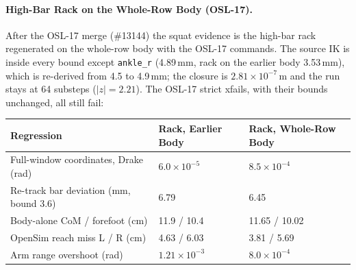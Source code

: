 \documentclass[11pt,a4paper]{article}
\begin{document}
\paragraph{High-Bar Rack on the Whole-Row Body (OSL-17).} After the OSL-17
merge (\#13144) the squat evidence is the high-bar rack regenerated on the
whole-row body with the OSL-17 commands. The source IK is inside every bound
except \texttt{ankle\_r} (4.89\,mm, rack on the earlier body 3.53\,mm), which
is re-derived from 4.5 to 4.9\,mm; the closure is $2.81\times10^{-7}$\,m and
the run stays at 64 substeps ($|z|=2.21$). The OSL-17 strict xfails, with
their bounds unchanged, all still fail:
\begin{center}\footnotesize\setlength{\tabcolsep}{3pt}
\begin{tabular}{lll}
\toprule
Regression & Rack, Earlier Body & Rack, Whole-Row Body\\
\midrule
Full-window coordinates, Drake (rad) & $6.0\times10^{-5}$ & $8.5\times10^{-4}$\\
Re-track bar deviation (mm, bound 3.6) & 6.79 & 6.45\\
Body-alone CoM / forefoot (cm) & 11.9 / 10.4 & 11.65 / 10.02\\
OpenSim reach miss L / R (cm) & 4.63 / 6.03 & 3.81 / 5.69\\
Arm range overshoot (rad) & $1.21\times10^{-3}$ & $8.0\times10^{-4}$\\
\bottomrule
\end{tabular}
\end{center}
\end{document}
